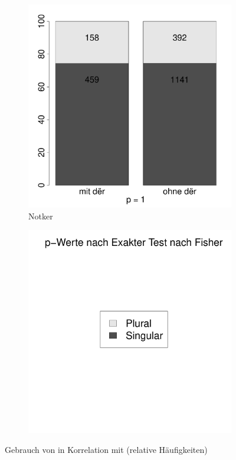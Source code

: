 \begin{figure}[p]
\begin{subfigure}[b]{.5\linewidth}
  \includegraphics[height=.25\textheight]{generated/images/numerus-notker}
\caption {Notker}
\end{subfigure}%
\begin{subfigure}[b]{.5\linewidth}
  \includegraphics[height=.25\textheight]{generated/images/numerus-legende}
\end{subfigure}

\caption{Gebrauch von  in Korrelation mit  (relative Häufigkeiten)}
\label{fig:numerus}
\end{figure}

